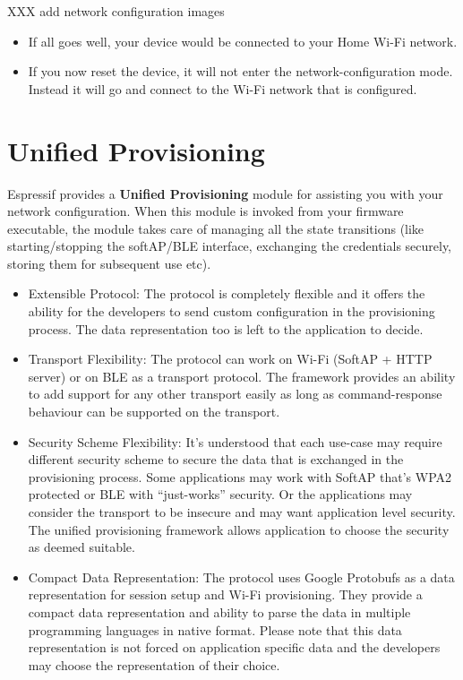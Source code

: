 \documentclass[main.tex]{subfiles}
\begin{document}

XXX add network configuration images

\begin{itemize}
    \item If all goes well, your device would be connected to your Home Wi-Fi network.
    \item If you now reset the device, it will not enter the network-configuration mode. Instead it will go and connect to the Wi-Fi network that is configured.
\end{itemize}

 
\section{Unified Provisioning}

Espressif provides a \textbf{Unified Provisioning} module for assisting you with your network configuration. When this module is invoked from your firmware executable, the module takes care of managing all the state transitions (like starting/stopping the softAP/BLE interface, exchanging the credentials securely, storing them for subsequent use etc).

\begin{itemize}

\item Extensible Protocol: The protocol is completely flexible and it offers the ability for the developers to send custom configuration in the provisioning process. The data representation too is left to the application to decide.
\item Transport Flexibility: The protocol can work on Wi-Fi (SoftAP + HTTP server) or on BLE as a transport protocol. The framework provides an ability to add support for any other transport easily as long as command-response behaviour can be supported on the transport.
\item Security Scheme Flexibility: It’s understood that each use-case may require different security scheme to secure the data that is exchanged in the provisioning process. Some applications may work with SoftAP that’s WPA2 protected or BLE with “just-works” security. Or the applications may consider the transport to be insecure and may want application level security. The unified provisioning framework allows application to choose the security as deemed suitable.
\item Compact Data Representation: The protocol uses Google Protobufs as a data representation for session setup and Wi-Fi provisioning. They provide a compact data representation and ability to parse the data in multiple programming languages in native format. Please note that this data representation is not forced on application specific data and the developers may choose the representation of their choice.

\end{itemize}
\end{document}
